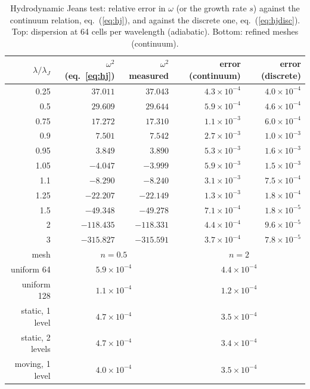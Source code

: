 \documentclass[11pt]{article}
\begin{document}
\begin{table}[t]
\centering
\small
\caption{Hydrodynamic Jeans test: relative error in $\omega$ (or the growth rate $s$) against
the continuum relation, eq.~(\ref{eq:hj}), and against the discrete one, eq.~(\ref{eq:hjdisc}).
Top: dispersion at 64 cells per wavelength (adiabatic). Bottom: refined meshes (continuum).}
\label{tab:hj}
\begin{tabular}{rrrrr}
\toprule
$\lambda/\lambda_J$ & $\omega^2$ (eq.~\ref{eq:hj}) & $\omega^2$ measured & error (continuum) & error (discrete) \\
\midrule
0.25 & $37.011$ & $37.043$ & $4.3\times10^{-4}$ & $4.0\times10^{-4}$ \\
0.5  & $29.609$ & $29.644$ & $5.9\times10^{-4}$ & $4.6\times10^{-4}$ \\
0.75 & $17.272$ & $17.310$ & $1.1\times10^{-3}$ & $6.0\times10^{-4}$ \\
0.9  & $7.501$  & $7.542$  & $2.7\times10^{-3}$ & $1.0\times10^{-3}$ \\
0.95 & $3.849$  & $3.890$  & $5.3\times10^{-3}$ & $1.6\times10^{-3}$ \\
1.05 & $-4.047$ & $-3.999$ & $5.9\times10^{-3}$ & $1.5\times10^{-3}$ \\
1.1  & $-8.290$ & $-8.240$ & $3.1\times10^{-3}$ & $7.5\times10^{-4}$ \\
1.25 & $-22.207$ & $-22.149$ & $1.3\times10^{-3}$ & $1.8\times10^{-4}$ \\
1.5  & $-49.348$ & $-49.278$ & $7.1\times10^{-4}$ & $1.8\times10^{-5}$ \\
2    & $-118.435$ & $-118.331$ & $4.4\times10^{-4}$ & $9.6\times10^{-5}$ \\
3    & $-315.827$ & $-315.591$ & $3.7\times10^{-4}$ & $7.8\times10^{-5}$ \\
\midrule
mesh & \multicolumn{2}{c}{$n = 0.5$} & \multicolumn{2}{c}{$n = 2$} \\
\midrule
uniform 64   & \multicolumn{2}{c}{$5.9\times10^{-4}$} & \multicolumn{2}{c}{$4.4\times10^{-4}$} \\
uniform 128  & \multicolumn{2}{c}{$1.1\times10^{-4}$} & \multicolumn{2}{c}{$1.2\times10^{-4}$} \\
static, 1 level  & \multicolumn{2}{c}{$4.7\times10^{-4}$} & \multicolumn{2}{c}{$3.5\times10^{-4}$} \\
static, 2 levels & \multicolumn{2}{c}{$4.7\times10^{-4}$} & \multicolumn{2}{c}{$3.4\times10^{-4}$} \\
moving, 1 level  & \multicolumn{2}{c}{$4.0\times10^{-4}$} & \multicolumn{2}{c}{$3.5\times10^{-4}$} \\

\end{tabular}
\end{table}
\end{document}
